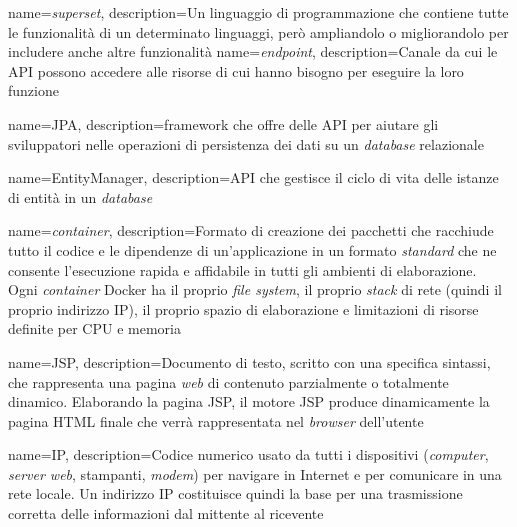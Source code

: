
{
    name=\textit{superset},
    description={Un linguaggio di programmazione che contiene tutte le
            funzionalità di un determinato linguaggi, però ampliandolo o
            migliorandolo per
            includere anche altre funzionalità}
}
{
    name=\textit{endpoint},
    description={Canale da cui le \gls{API} possono accedere alle risorse di
            cui hanno bisogno per eseguire la loro funzione}
}

{
    name=JPA,
    description={\Gls{framework} che offre delle \gls{API} per aiutare gli
            sviluppatori nelle operazioni di persistenza dei dati su un
            \textit{database}
            relazionale}
}

{
    name=EntityManager,
    description={API che gestisce il ciclo di vita delle istanze di entità in
            un \textit{database}}
}

{
    name=\textit{container},
    description={Formato di creazione dei pacchetti che racchiude tutto il
            codice e le dipendenze di un'applicazione in un formato
            \textit{standard} che
            ne consente l'esecuzione rapida e affidabile in tutti gli ambienti
            di
            elaborazione.\\ Ogni \textit{container} Docker ha il proprio
            \textit{file
                system}, il
            proprio \textit{stack} di rete (quindi il proprio indirizzo
            \gls{IP}), il
            proprio spazio di elaborazione e limitazioni di risorse definite
            per CPU e
            memoria}
}

{
    name=JSP,
    description={Documento di testo, scritto con una specifica sintassi, che
            rappresenta una pagina \textit{web} di contenuto parzialmente o
            totalmente
            dinamico. Elaborando la pagina JSP, il motore JSP produce
            dinamicamente la
            pagina HTML finale che verrà rappresentata nel \textit{browser}
            dell'utente}
}

{
    name=IP,
    description={Codice numerico usato da tutti i dispositivi
            (\textit{computer}, \textit{server web}, stampanti, \textit{modem})
            per
            navigare in Internet e per comunicare in una rete locale. Un
            indirizzo IP
            costituisce quindi la base per una trasmissione corretta delle
            informazioni dal
            mittente al ricevente}
}

